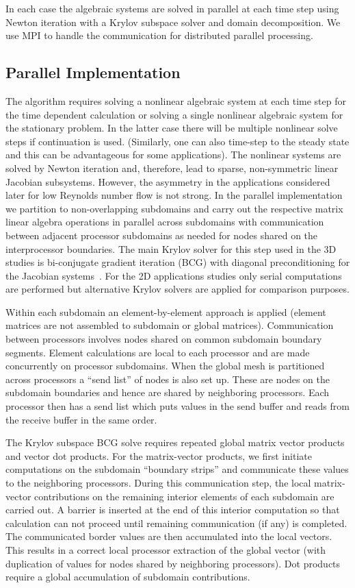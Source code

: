 In each case the algebraic systems are solved in parallel at each time step
using Newton
iteration with a Krylov subspace solver and domain decomposition. We use
MPI
to handle the communication for distributed parallel processing.

\subsection{Parallel Implementation}
The algorithm requires solving a nonlinear algebraic system at each time
step for the time dependent calculation  or solving a single nonlinear
algebraic system for the stationary problem. In the latter case there will
be multiple nonlinear solve steps if continuation is used. (Similarly, one
can also time-step to the steady state and this can be advantageous for some
applications).  The nonlinear systems are solved by Newton iteration and, therefore, lead to sparse, non-symmetric linear Jacobian subsystems.
However,  the asymmetry in
the applications considered later for low Reynolds number  flow is not
strong. In
the parallel implementation  we partition to non-overlapping
subdomains and carry out the respective matrix linear algebra operations in
parallel across subdomains with communication between adjacent processor
subdomains as needed for nodes shared on the interprocessor boundaries. The
main Krylov solver for this step used in the 3D studies is bi-conjugate
gradient iteration
(BCG) with diagonal preconditioning for the Jacobian
systems~\cite{ijnmf98,carey_world_scientific_2000}. For the 2D applications studies only serial
computations are performed but alternative Krylov solvers are applied for
comparison purposes. 

Within each subdomain an
element-by-element approach is applied (element matrices are not assembled to subdomain or global matrices). Communication between processors
involves nodes shared on common subdomain boundary segments.  Element
calculations are local to each processor and are made concurrently on processor subdomains.
When the global mesh is partitioned across processors a ``send list'' of
nodes is also set up.  These are nodes on the subdomain boundaries and
hence are shared by neighboring processors. Each processor then has a
send list which puts values in the send buffer and reads from the
receive buffer in the same order.

The Krylov subspace BCG solve requires repeated global matrix vector
products and vector dot products.  For the matrix-vector products, we
first initiate computations on the subdomain ``boundary strips'' and
communicate these values to the neighboring processors.  During this
communication step, the local matrix-vector contributions on the
remaining interior elements of each subdomain are carried out.  A
barrier is inserted at the end of this interior computation so that
calculation can not proceed until remaining communication (if any) is
completed.  The communicated border values are then accumulated into the
local vectors.  This results in a correct local processor extraction of
the global vector (with duplication of values for nodes shared by
neighboring processors). Dot products require a global accumulation of
subdomain contributions.



